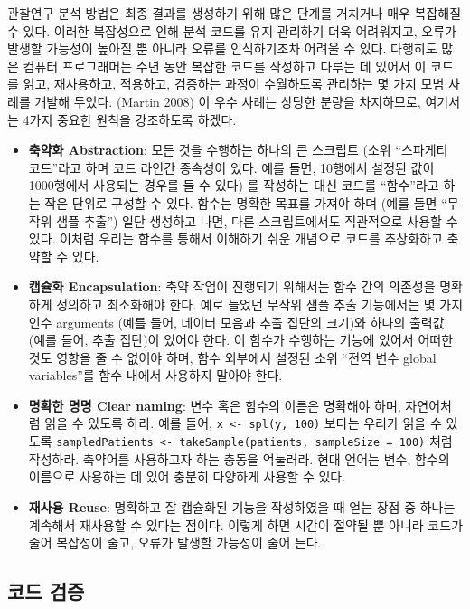 \documentclass[10.5pt]{book}
\providecommand{\tightlist}{%
  \setlength{\itemsep}{0pt}\setlength{\parskip}{0pt}}
\theoremstyle{definition}
\theoremstyle{definition}
\theoremstyle{definition}
\theoremstyle{remark}
\begin{document}
관찰연구 분석 방법은 최종 결과를 생성하기 위해 많은 단계를 거치거나 매우
복잡해질 수 있다. 이러한 복잡성으로 인해 분석 코드를 유지 관리하기 더욱
어려워지고, 오류가 발생할 가능성이 높아질 뿐 아니라 오류를 인식하기조차
어려울 수 있다. 다행히도 많은 컴퓨터 프로그래머는 수년 동안 복잡한
코드를 작성하고 다루는 데 있어서 이 코드를 읽고, 재사용하고, 적용하고,
검증하는 과정이 수월하도록 관리하는 몇 가지 모범 사례를 개발해 두었다.
(Martin 2008) 이 우수 사례는 상당한 분량을 차지하므로, 여기서는 4가지
중요한 원칙을 강조하도록 하겠다. 

\begin{itemize}
\tightlist
\item
  \textbf{축약화 Abstraction}: 모든 것을 수행하는 하나의 큰 스크립트
  (소위 ``스파게티 코드''라고 하며 코드 라인간 종속성이 있다. 예를 들면,
  10행에서 설정된 값이 1000행에서 사용되는 경우를 들 수 있다) 를
  작성하는 대신 코드를 ``함수''라고 하는 작은 단위로 구성할 수 있다.
  함수는 명확한 목표를 가져야 하며 (예를 들면 ``무작위 샘플 추출'') 일단
  생성하고 나면, 다른 스크립트에서도 직관적으로 사용할 수 있다. 이처럼
  우리는 함수를 통해서 이해하기 쉬운 개념으로 코드를 추상화하고 축약할
  수 있다.
\item
  \textbf{캡슐화 Encapsulation}: 축약 작업이 진행되기 위해서는 함수 간의
  의존성을 명확하게 정의하고 최소화해야 한다. 예로 들었던 무작위 샘플
  추출 기능에서는 몇 가지 인수 arguments (예를 들어, 데이터 모음과 추출
  집단의 크기)와 하나의 출력값 (예를 들어, 추출 집단)이 있어야 한다. 이
  함수가 수행하는 기능에 있어서 어떠한 것도 영향을 줄 수 없어야 하며,
  함수 외부에서 설정된 소위 ``전역 변수 global variables''를 함수 내에서
  사용하지 말아야 한다.
\item
  \textbf{명확한 명명 Clear naming}: 변수 혹은 함수의 이름은 명확해야
  하며, 자연어처럼 읽을 수 있도록 하라. 예를 들어,
  \texttt{x\ \textless{}-\ spl(y,\ 100)} 보다는 우리가 읽을 수 있도록
  \texttt{sampledPatients\ \textless{}-\ takeSample(patients,\ sampleSize\ =\ 100)}
  처럼 작성하라. 축약어를 사용하고자 하는 충동을 억눌러라. 현대 언어는
  변수, 함수의 이름으로 사용하는 데 있어 충분히 다양하게 사용할 수 있다.
\item
  \textbf{재사용 Reuse}: 명확하고 잘 캡슐화된 기능을 작성하였을 때 얻는
  장점 중 하나는 계속해서 재사용할 수 있다는 점이다. 이렇게 하면 시간이
  절약될 뿐 아니라 코드가 줄어 복잡성이 줄고, 오류가 발생할 가능성이
  줄어 든다.
\end{itemize}

\subsection{코드 검증}\label{-}
\end{document}

